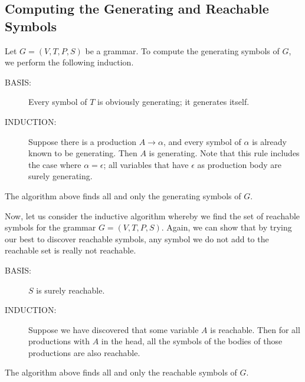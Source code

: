 \documentclass[]{article}
\begin{document}
  \subsection*{Computing the Generating and Reachable Symbols}
    Let $G = (V,T,P,S)$ be a grammar. To compute the generating symbols of $G$,
    we perform the following induction.
      \begin{description}
        \item[BASIS:] Every symbol of $T$ is obviously generating; it generates
        itself.
        \item[INDUCTION:] Suppose there is a production $A \rightarrow \alpha$,
        and every symbol of $\alpha$ is already known to be generating. Then $A$
        is generating. Note that this rule includes the case where $\alpha =
        \epsilon$; all variables that have $\epsilon$ as production body are
        surely generating.
      \end{description}
      \begin{thm}
        The algorithm above finds all and only the generating symbols of $G$.
      \end{thm}
    Now, let us consider the inductive algorithm whereby we find the set of
    reachable symbols for the grammar $G = (V,T,P,S)$. Again, we can show that
    by trying our best to discover reachable symbols, any symbol we do not add
    to the reachable set is really not reachable.
      \begin{description}
        \item[BASIS:] $S$ is surely reachable.
        \item[INDUCTION:] Suppose we have discovered that some variable $A$ is
        reachable. Then for all productions with $A$ in the head, all the
        symbols of the bodies of those productions are also reachable.
      \end{description}
      \begin{thm}
        The algorithm above finds all and only the reachable symbols of $G$.
      \end{thm}
\end{document}
